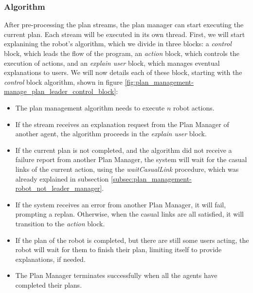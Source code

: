 \subsubsection{Algorithm}
After pre-processing the plan streams, the plan manager can start executing the current plan. Each stream will be executed in its own thread. First, we will start explanining the robot's algorithm, which we divide in three blocks: a \textit{control} block, which leads the flow of the program, an \textit{action} block, which controls the execution of actions, and an \textit{explain user} block, which manages eventual explanations to users. We will now details each of these block, starting with the \textit{control} block algorithm, shown in figure \ref{fig:plan_management-manage_plan_leader_control_block}:
\begin{itemize}
\item The plan management algorithm needs to execute $n$ robot actions.
\item If the stream receives an explanation request from the Plan Manager of another agent, the algorithm proceeds in the \textit{explain user} block.
\item If the current plan is not completed, and the algorithm did not receive a failure report from another Plan Manager, the system will wait for the casual links of the current action, using the \textit{waitCasualLink} procedure, which was already explained in subsection \ref{subsec:plan_management-robot_not_leader_manager}.
\item If the system receives an error from another Plan Manager, it will fail, prompting a replan. Otherwise, when the casual links are all satisfied, it will transition to the \textit{action} block.
\item If the plan of the robot is completed, but there are still some users acting, the robot will wait for them to finish their plan, limiting itself to provide explanations, if needed.
\item The Plan Manager terminates successfully when all the agents have completed their plans.
\end{itemize}


